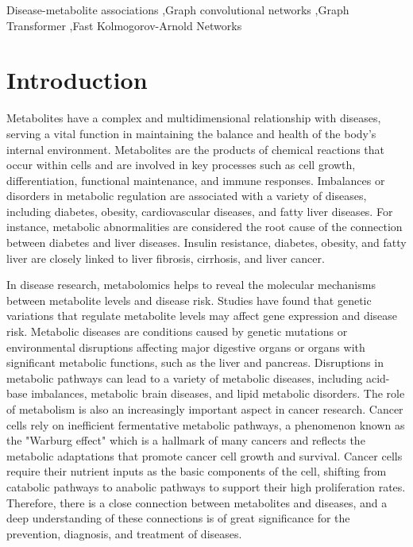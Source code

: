 \documentclass[a4paper,fleqn]{cas-dc}
\begin{document}
\begin{keywords}
	Disease-metabolite associations \sep Graph convolutional networks \sep Graph Transformer \sep Fast Kolmogorov-Arnold Networks
\end{keywords}

\maketitle

\section{Introduction}\label{sec1}
Metabolites have a complex and multidimensional relationship with diseases, serving a vital function in maintaining the balance and health of the body's internal environment\cite{transport1}. Metabolites are the products of chemical reactions that occur within cells and are involved in key processes such as cell growth, differentiation, functional maintenance, and immune responses. Imbalances or disorders in metabolic regulation are associated with a variety of diseases, including diabetes\cite{dhanya2016salivary}, obesity\cite{drucker2021diabetes}, cardiovascular\cite{amiri2022role} diseases, and fatty liver diseases. For instance, metabolic abnormalities are considered the root cause of the connection between diabetes and liver diseases. Insulin resistance\cite{lee2022insulin}, diabetes, obesity, and fatty liver are closely linked to liver fibrosis, cirrhosis,  and liver cancer\cite{liu2021transition}.

In disease research, metabolomics helps to reveal the molecular mechanisms between metabolite levels and disease risk\cite{chen2022guide}. Studies have found that genetic variations that regulate metabolite levels may affect gene expression and disease risk. Metabolic diseases are conditions caused\cite{hoffman2021developmental} by genetic mutations or environmental disruptions affecting major digestive organs or organs with significant metabolic functions, such as the liver and pancreas. Disruptions in metabolic pathways can lead to a variety of metabolic diseases, including acid-base imbalances, metabolic brain diseases\cite{jensen2020effects}, and lipid metabolic disorders\cite{aron2021metabolism}. The role of metabolism is also an increasingly important aspect in cancer research. Cancer cells rely on inefficient fermentative metabolic pathways, a phenomenon known as the "Warburg effect"\cite{vaupel2021revisiting} which is a hallmark of many cancers and reflects the metabolic adaptations that promote cancer cell growth and survival. Cancer cells require their nutrient inputs as the basic components of the cell, shifting from catabolic pathways to anabolic pathways to support their high proliferation rates\cite{martinez2021cancer}. Therefore, there is a close connection between metabolites and diseases, and a deep understanding of these connections is of great significance for the prevention, diagnosis, and treatment of diseases.
\end{document}
